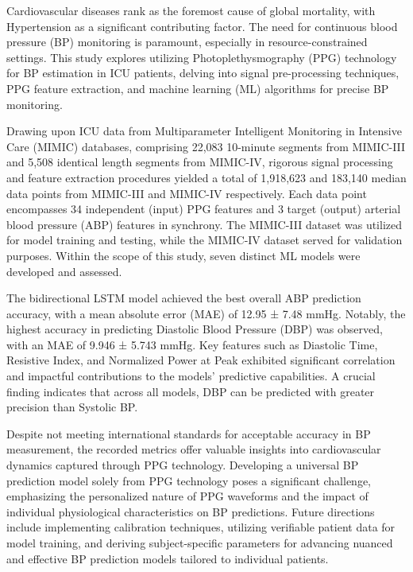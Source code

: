     Cardiovascular diseases rank as the foremost cause of global mortality, with Hypertension as a significant contributing factor.
    The need for continuous blood pressure (BP) monitoring is paramount, especially in resource-constrained settings.
    This study explores utilizing Photoplethysmography (PPG) technology for BP estimation in ICU patients, delving into signal pre-processing techniques,
    PPG feature extraction, and machine learning (ML) algorithms for precise BP monitoring.

    \vspace{0.5cm}

    Drawing upon ICU data from Multiparameter Intelligent Monitoring in Intensive Care (MIMIC) databases, comprising 22,083 10-minute segments from MIMIC-III and 5,508 identical length segments from MIMIC-IV,
    rigorous signal processing and feature extraction procedures yielded a total of 1,918,623 and 183,140 median data points from MIMIC-III and MIMIC-IV respectively.
    Each data point encompasses 34 independent (input) PPG features and 3 target (output) arterial blood pressure (ABP) features in synchrony.
    The MIMIC-III dataset was utilized for model training and testing, while the MIMIC-IV dataset served for validation purposes.
    Within the scope of this study, seven distinct ML models were developed and assessed.

    \vspace{0.5cm}

    The bidirectional LSTM model achieved the best overall ABP prediction accuracy, with a mean absolute error (MAE) of 12.95 ± 7.48 mmHg.
    Notably, the highest accuracy in predicting Diastolic Blood Pressure (DBP) was observed, with an MAE of 9.946 ± 5.743 mmHg.
    Key features such as Diastolic Time, Resistive Index, and Normalized Power at Peak exhibited significant correlation and impactful contributions to the models' predictive capabilities.
    A crucial finding indicates that across all models, DBP can be predicted with greater precision than Systolic BP\@.

    \vspace{0.5cm}

    Despite not meeting international standards for acceptable accuracy in BP measurement, the recorded metrics offer valuable insights into cardiovascular dynamics captured through PPG technology.
    Developing a universal BP prediction model solely from PPG technology poses a significant challenge, emphasizing the personalized nature of PPG waveforms
    and the impact of individual physiological characteristics on BP predictions.
    Future directions include implementing calibration techniques, utilizing verifiable patient data for model training, and deriving subject-specific parameters
    for advancing nuanced and effective BP prediction models tailored to individual patients.